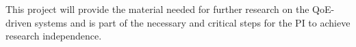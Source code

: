 This project will provide the material needed for further research on the QoE-driven systems and is part of the necessary and critical steps for the PI to achieve research independence.

